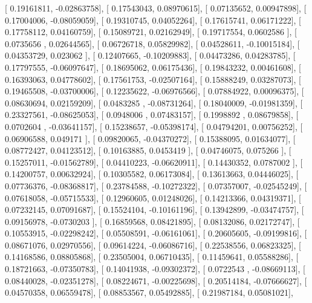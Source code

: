 \documentclass{article}
\begin{document}
       [ 0.19161811, -0.02863758],
       [ 0.17543043,  0.08970615],
       [ 0.07135652,  0.00947898],
       [ 0.17004006, -0.08059059],
       [ 0.19310745,  0.04052264],
       [ 0.17615741,  0.06171222],
       [ 0.17758112,  0.04160759],
       [ 0.15089721,  0.02162949],
       [ 0.19717554,  0.0602586 ],
       [ 0.0735656 ,  0.02644565],
       [ 0.06726718,  0.05829982],
       [ 0.04528611, -0.10015184],
       [ 0.04353729,  0.023062  ],
       [ 0.12407665, -0.10209883],
       [ 0.04473286,  0.04283785],
       [ 0.17797555, -0.06097647],
       [ 0.18695062,  0.06175436],
       [ 0.19843232,  0.00461608],
       [ 0.16393063,  0.04778602],
       [ 0.17561753, -0.02507164],
       [ 0.15888249,  0.03287073],
       [ 0.19465508, -0.03700006],
       [ 0.12235622, -0.06976566],
       [ 0.07884922,  0.00096375],
       [ 0.08630694,  0.02159209],
       [ 0.0483285 , -0.08731264],
       [ 0.18040009, -0.01981359],
       [ 0.23327561, -0.08625053],
       [ 0.0948006 ,  0.07483157],
       [ 0.1998892 ,  0.08679858],
       [ 0.0702604 , -0.03641157],
       [ 0.15238657, -0.05398174],
       [ 0.04794201,  0.00756252],
       [ 0.06906588,  0.049171  ],
       [ 0.09820065, -0.04370272],
       [ 0.15388095,  0.01634077],
       [ 0.08772427,  0.04123512],
       [ 0.10163885,  0.0453419 ],
       [ 0.04746075,  0.075266  ],
       [ 0.15257011, -0.01562789],
       [ 0.04410223, -0.06620911],
       [ 0.14430352,  0.0787002 ],
       [ 0.14200757,  0.00632924],
       [ 0.10305582,  0.06173084],
       [ 0.13613663,  0.04446025],
       [ 0.07736376, -0.08368817],
       [ 0.23784588, -0.10272322],
       [ 0.07357007, -0.02545249],
       [ 0.07618058, -0.05715533],
       [ 0.12960605,  0.01248026],
       [ 0.14213366,  0.04319371],
       [ 0.07232145,  0.07091687],
       [ 0.15524104, -0.10161196],
       [ 0.13942899, -0.03474757],
       [ 0.09156978, -0.0730203 ],
       [ 0.16859568,  0.08421895],
       [ 0.08132086,  0.02172747],
       [ 0.10553915, -0.02298242],
       [ 0.05508591, -0.06161061],
       [ 0.20605605, -0.09199816],
       [ 0.08671076,  0.02970556],
       [ 0.09614224, -0.06086716],
       [ 0.22538556,  0.06823325],
       [ 0.14168586,  0.08805868],
       [ 0.23505004,  0.06710435],
       [ 0.11459641,  0.05588286],
       [ 0.18721663, -0.07350783],
       [ 0.14041938, -0.09302372],
       [ 0.0722543 , -0.08669113],
       [ 0.08440028, -0.02351278],
       [ 0.08224671, -0.00225698],
       [ 0.20514184, -0.07666627],
       [ 0.04570358,  0.06559478],
       [ 0.08853567,  0.05492885],
       [ 0.21987184,  0.05081021],
\end{document}
